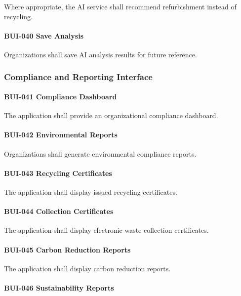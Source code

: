 Where appropriate, the AI service shall recommend refurbishment instead
of recycling.

\paragraph{BUI-040 Save Analysis}

Organizations shall save AI analysis results for future reference.


\subsubsection*{Compliance and Reporting Interface}

\paragraph{BUI-041 Compliance Dashboard}

The application shall provide an organizational compliance dashboard.

\paragraph{BUI-042 Environmental Reports}

Organizations shall generate environmental compliance reports.

\paragraph{BUI-043 Recycling Certificates}

The application shall display issued recycling certificates.

\paragraph{BUI-044 Collection Certificates}

The application shall display electronic waste collection certificates.

\paragraph{BUI-045 Carbon Reduction Reports}

The application shall display carbon reduction reports.

\paragraph{BUI-046 Sustainability Reports}


